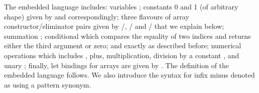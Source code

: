 The embedded language  includes: variables ; constants 0 and 1
(of arbitrary shape) given by  and  correspondingly; three
flavours of array constructor/eliminator pairs given by /,
/ and / that we explain below;
summation ; conditional
 which compares the equality of two indices and returns either
the third argument or zero;  and  exactly as described before;
numerical operations which includes , plus,
multiplication, division by a constant , and unary ;
finally, let bindings for arrays are given by .
The definition of the embedded language  follows. We also introduce 
the syntax for infix minus denoted as  using a pattern synonym.
